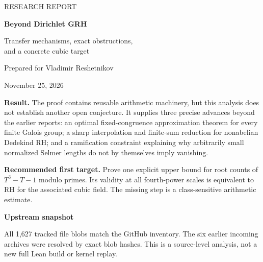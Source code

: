 \documentclass[11pt,letterpaper]{article}
\theoremstyle{definition}
\theoremstyle{remark}
\begin{document}
\begin{titlepage}
\vspace*{.45in}
{\sffamily\color{accent}\large RESEARCH REPORT\par}
\vspace{.22in}
{\sffamily\bfseries\color{ink}\Huge Beyond Dirichlet GRH\par}
\vspace{.18in}
{\sffamily\LARGE Transfer mechanisms, exact obstructions,\\[5pt]
and a concrete cubic target\par}
\vspace{.35in}
{\large Prepared for Vladimir Reshetnikov\par}
\vspace{.08in}
{November 25, 2026\par}
\vspace{.4in}
\noindent\colorbox{light}{\begin{minipage}{.94\textwidth}
\vspace{9pt}
\textbf{Result.} The proof contains reusable arithmetic machinery, but this
analysis does not establish another open conjecture. It supplies three
precise advances beyond the earlier reports: an optimal fixed-congruence
approximation theorem for every finite Galois group; a sharp interpolation
and finite-sum reduction for nonabelian Dedekind RH; and a ramification
constraint explaining why arbitrarily small normalized Selmer lengths do
not by themselves imply vanishing.
\vspace{7pt}

\textbf{Recommended first target.} Prove one explicit upper bound for
root counts of $T^3-T-1$ modulo primes. Its validity at all fourth-power
scales is equivalent to RH for the associated cubic field. The missing
step is a class-sensitive arithmetic estimate.
\vspace{9pt}
\end{minipage}}
\vfill
\noindent\textbf{Upstream snapshot}\par
{}\par
{}\par
\vspace{8pt}
\noindent All 1,627 tracked file blobs match the GitHub inventory. The six
earlier incoming archives were resolved by exact blob hashes. This is a
source-level analysis, not a new full Lean build or kernel replay.
\end{titlepage}
\end{document}
